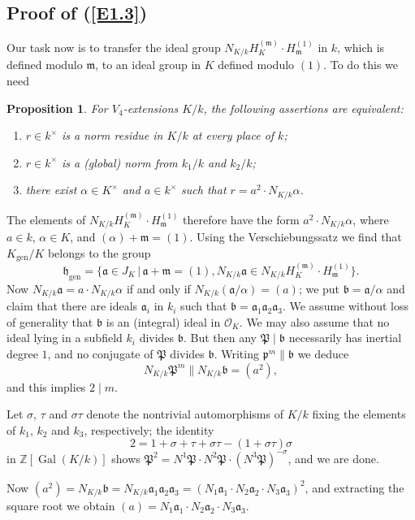 \documentclass{amsart}
\newcommand{\Z}{\mathbb Z}
\newcommand{\fa}{{\mathfrak a}}
\newcommand{\fb}{{\mathfrak b}}
\newcommand{\fp}{{\mathfrak p}}
\newcommand{\fP}{{\mathfrak P}}
\newcommand{\fh}{{\mathfrak h}}
\newcommand{\fm}{{\mathfrak m}}
\newcommand{\OO}{{\mathcal O}}
\newcommand{\sth}{\,|\,}
\newcommand{\Gal}{\operatorname{Gal}}
\newcommand{\gen}{{\operatorname{gen}}}
\newtheorem{prop}{Proposition}
\begin{document}
\subsection*{Proof of (\ref{E1.3})}
Our task now is to transfer the ideal group
$N_{K/k} H_K^{(\fm)} \cdot H_\fm^{(1)}$ in $k$, which is
defined modulo $\fm$, to an ideal group in $K$ defined
modulo $(1)$. To do this we need

\begin{prop}\label{P2.2}
For $V_4$-extensions $K/k$, the following assertions are
equivalent:
\begin{enumerate}
\item[(i)] $r \in k^\times$ is a norm residue in $K/k$ at
           every place of $k$;
\item[(ii)] $r \in k^\times$ is a (global) norm from $k_1/k$
           and $k_2/k$;
\item[(iii)] there exist $\alpha \in K^\times$ and
           $a \in k^\times$ such that $r = a^2 \cdot N_{K/k} \alpha$.
\end{enumerate}
\end{prop}

The elements of $N_{K/k} H_K^{(\fm)} \cdot H_\fm^{(1)}$ therefore
have the form $a^2 \cdot N_{K/k} \alpha$, where $a \in k$,
$\alpha \in K$, and $(\alpha) + \fm = (1)$. Using the
Verschiebungssatz we find that $K_\gen/K$ belongs to the group
$$ \fh_\gen = \{ \fa \in J_K \sth \fa + \fm = (1),
    N_{K/k} \fa \in N_{K/k} H_K^{(\fm)} \cdot H_\fm^{(1)}\}.$$
Now $N_{K/k} \fa = a \cdot N_{K/k} \alpha$ if and only if
$N_{K/k} (\fa/\alpha) = (a)$; we put $\fb = \fa/\alpha$
and claim that there are ideals $\fa_i$ in $k_i$ such that
$\fb = \fa_1 \fa_2 \fa_3$. We assume without loss of
generality that $\fb$ is an (integral) ideal in $\OO_K$.
We may also assume that no ideal lying in a subfield $k_i$
divides $\fb$. But then any $\fP \mid \fb$ necessarily has
inertial degree $1$, and no conjugate of $\fP$ divides $\fb$.
Writing $\fp^m \parallel \fb$ we deduce
$$ N_{K/k} \fP^m \parallel N_{K/k} \fb = (a^2), $$
and this implies $2 \mid m$.

Let $\sigma$, $\tau$ and $\sigma\tau$ denote the nontrivial
automorphisms of $K/k$ fixing the elements of $k_1$, $k_2$
and $k_3$, respectively; the identity
$$ 2 = 1 + \sigma + \tau + \sigma\tau - (1+\sigma\tau)\sigma $$
in $\Z[\Gal(K/k)]$ shows
$\fP^2 = N^1 \fP \cdot N^2 \fP \cdot (N^3 \fP)^{-\sigma}$,
and we are done.

Now $(a^2) = N_{K/k} \fb = N_{K/k} \fa_1\fa_2\fa_3 =
 (N_1 \fa_1 \cdot N_2 \fa_2 \cdot N_3 \fa_3)^2$, and
extracting the square root we obtain
$(a) = N_1 \fa_1 \cdot N_2 \fa_2 \cdot N_3 \fa_3$.
\end{document}
